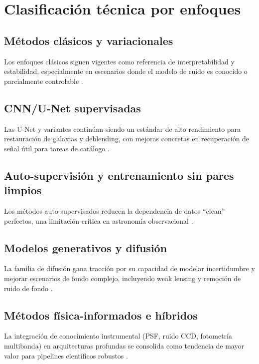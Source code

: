 \section{Clasificaci\'on t\'ecnica por enfoques}

\subsection{M\'etodos cl\'asicos y variacionales}
Los enfoques cl\'asicos siguen vigentes como referencia de interpretabilidad y estabilidad, especialmente en escenarios donde el modelo de ruido es conocido o parcialmente controlable \cite{roscani2020comparative, makarkin2021stateart, bui2023poisson}.

\subsection{CNN/U-Net supervisadas}
Las U-Net y variantes contin\'uan siendo un est\'andar de alto rendimiento para restauraci\'on de galaxias y deblending, con mejoras concretas en recuperaci\'on de se\~nal \'util para tareas de cat\'alogo \cite{vojtekova2020unet, hemmati2022deblending, park2024transformer, miao2024astrosr}.

\subsection{Auto-supervisi\'on y entrenamiento sin pares limpios}
Los m\'etodos auto-supervisados reducen la dependencia de datos ``clean'' perfectos, una limitaci\'on cr\'itica en astronom\'ia observacional \cite{liu2025selfsupervised, guo2026detection, sukurdeepa2025astroclearnet}.

\subsection{Modelos generativos y difusi\'on}
La familia de difusi\'on gana tracci\'on por su capacidad de modelar incertidumbre y mejorar escenarios de fondo complejo, incluyendo weak lensing y remoci\'on de ruido de fondo \cite{scognamiglio2025euclid, aoyama2025denoising, nicolaas2025bgrem, schanz2023diffusion, remy2023massmapping}.

\subsection{M\'etodos f\'isica-informados e h\'ibridos}
La integraci\'on de conocimiento instrumental (PSF, ruido CCD, fotometr\'ia multibanda) en arquitecturas profundas se consolida como tendencia de mayor valor para pipelines cient\'ificos robustos \cite{wang2022psf, sreejith2023psf, akhaury2022deep, akhaury2025joint, liu2026ccd}.

